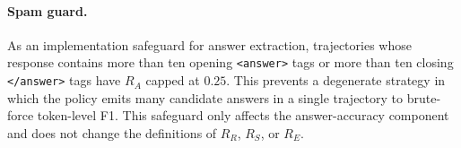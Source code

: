 \documentclass[11pt]{article}
\begin{document}
\paragraph{Spam guard.}
As an implementation safeguard for answer extraction, trajectories whose response contains more than ten opening \texttt{<answer>} tags or more than ten closing \texttt{</answer>} tags have $R_A$ capped at $0.25$. This prevents a degenerate strategy in which the policy emits many candidate answers in a single trajectory to brute-force token-level F1. This safeguard only affects the answer-accuracy component and does not change the definitions of $R_R$, $R_S$, or $R_E$.



\end{document}
